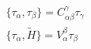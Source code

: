 \begin{equation}
 \begin{array}{l}
 \{\tau_\alpha , \tau_\beta\} = C_{\alpha\beta} ^\gamma \tau_\gamma \\ \{\tau_\alpha , \tilde{H} \} = V_\alpha ^\beta
 \tau_\beta
 \end{array}
 \label{a35}
 \end{equation}

